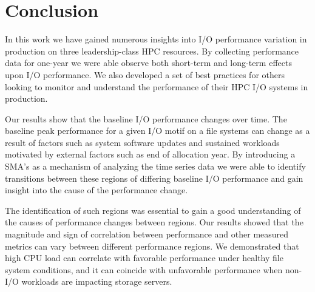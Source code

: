 \section{Conclusion} \label{sec:conclusions}

% 
% 
%
% 
%
%
%
% 
% 


In this work we have gained numerous insights into I/O performance variation in production on three leadership-class HPC resources. By collecting performance data for one-year we were able observe both short-term and long-term effects upon I/O performance. We also developed a set of best practices for others looking to monitor and understand the performance of their HPC I/O systems in production.

Our results show that the baseline I/O performance changes over time. The baseline peak performance for a given I/O motif on a file systems can change as a result of factors such as system software updates and sustained workloads motivated by external factors such as end of allocation year. By introducing a SMA's as a mechanism of analyzing the time series data we were able to identify transitions between these regions of differing baseline I/O performance and gain insight into the cause of the performance change. 

The identification of such regions was essential to gain a good understanding of the causes of performance changes between regions. Our results showed that the magnitude and sign of correlation between performance and other measured metrics can vary between different performance regions.
We demonstrated that high CPU load can correlate with favorable performance under healthy file system conditions, and it can coincide with unfavorable performance when non-I/O workloads are impacting storage servers.

